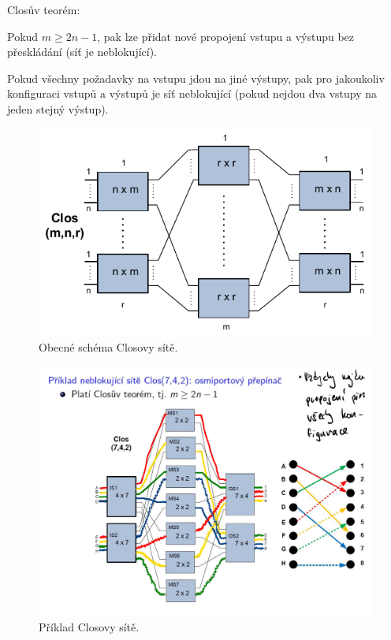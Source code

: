 \noindent Closův teorém: \begin{compactitem}
    \item Pokud $m \geq 2n - 1$, pak lze přidat nové propojení vstupu a výstupu bez přeskládání (síť je neblokující). \begin{compactitem}
        \item Pokud všechny požadavky na vstupu jdou na jiné výstupy, pak pro jakoukoliv konfiguraci vstupů a výstupů je síť neblokující (pokud nejdou dva vstupy na jeden stejný výstup).
    \end{compactitem}
\end{compactitem}

\begin{figure}[H]
    \centering
    \includegraphics[width=0.75\linewidth]{clos.pdf}
    \caption{Obecné schéma Closovy sítě.}
\end{figure}

\begin{figure}[H]
    \centering
    \includegraphics[width=1\linewidth]{clos_priklad.pdf}
    \caption{Příklad Closovy sítě.}
\end{figure}

